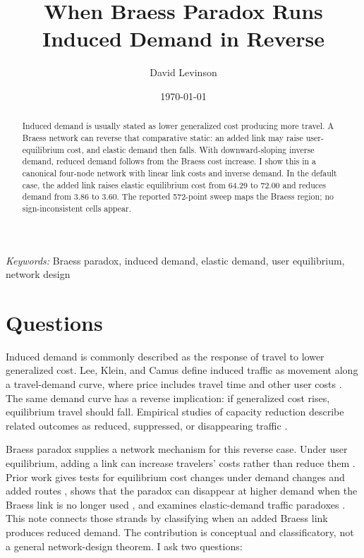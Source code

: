 \documentclass{article}
\title{When Braess Paradox Runs Induced Demand in Reverse}
\author{David Levinson}
\date{\today}
\begin{document}
\maketitle

\begin{abstract}
Induced demand is usually stated as lower generalized cost producing more travel. A Braess network can reverse that comparative static: an added link may raise user-equilibrium cost, and elastic demand then falls. With downward-sloping inverse demand, reduced demand follows from the Braess cost increase. I show this in a canonical four-node network with linear link costs and inverse demand. In the default case, the added link raises elastic equilibrium cost from 64.29 to 72.00 and reduces demand from 3.86 to 3.60. The reported 572-point sweep maps the Braess region; no sign-inconsistent cells appear.
\end{abstract}

\textit{Keywords:} Braess paradox, induced demand, elastic demand, user equilibrium, network design

\section{Questions}

Induced demand is commonly described as the response of travel to lower generalized cost. Lee, Klein, and Camus define induced traffic as movement along a travel-demand curve, where price includes travel time and other user costs \citep{lee1999induced}. The same demand curve has a reverse implication: if generalized cost rises, equilibrium travel should fall. Empirical studies of capacity reduction describe related outcomes as reduced, suppressed, or disappearing traffic \citep{goodwin1998capacity,cairns2002disappearing,behrens2004capacity,zhu2010i35w}.

Braess paradox supplies a network mechanism for this reverse case. Under user equilibrium, adding a link can increase travelers' costs rather than reduce them \citep{braess1968paradoxon,braess2005paradox,murchland1970braess,yang1998capacity}. Prior work gives tests for equilibrium cost changes under demand changes and added routes \citep{dafermos1984paradoxes}, shows that the paradox can disappear at higher demand when the Braess link is no longer used \citep{nagurney2010negation}, and examines elastic-demand traffic paradoxes \citep{hallefjord1994traffic,tu2019traffic,nagurney2020braess}. This note connects those strands by classifying when an added Braess link produces reduced demand. The contribution is conceptual and classificatory, not a general network-design theorem. I ask two questions:
\end{document}
